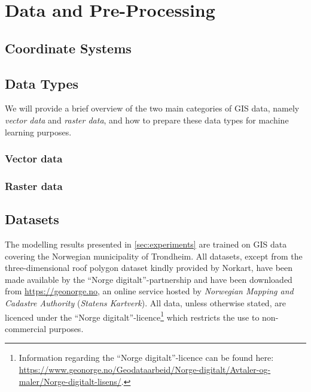\chapter{Data and Pre-Processing}%
\label{sec:data}



\section{Coordinate Systems}%
\label{sec:coordinate-systems}


\section{Data Types}%
\label{sec:data-types}

We will provide a brief overview of the two main categories of GIS data, namely \textit{vector data} and \textit{raster data}, and how to prepare these data types for machine learning purposes.

\subsection{Vector data}%
\label{sec:vector-data}


\subsection{Raster data}%
\label{sec:raster-data}


\section{Datasets}%
\label{sec:data-sets}

The modelling results presented in \cref{sec:experiments} are trained on GIS data covering the Norwegian municipality of Trondheim.
All datasets, except from the three-dimensional roof polygon dataset kindly provided by Norkart, have been made available by the \enquote{Norge digitalt}-partnership and have been downloaded from \url{https://geonorge.no}, an online service hosted by \textit{Norwegian Mapping and Cadastre Authority} (\textit{Statens Kartverk}).
All data, unless otherwise stated, are licenced under the \enquote{Norge digitalt}-licence\footnote{Information regarding the \enquote{Norge digitalt}-licence can be found here: \url{https://www.geonorge.no/Geodataarbeid/Norge-digitalt/Avtaler-og-maler/Norge-digitalt-lisens/}.} which restricts the use to non-commercial purposes.

